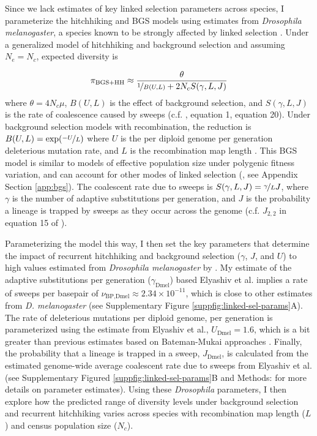 \documentclass[11pt]{article}
\newcommand{\Newnameref}[1]{\textit{\nameref{#1}}}
\begin{document}
Since we lack estimates of key linked selection parameters across species, I
parameterize the hitchhiking and BGS models using estimates from
\emph{Drosophila melanogaster}, a species known to be strongly affected by
linked selection \parencite{Sella2009-nx}. Under a generalized model of
hitchhiking and background selection \parencite{Elyashiv2016-vt,Coop2012-cd}
and assuming $N_e = N_c$, expected diversity is

\begin{align} 
  \pi_\text{BGS+HH} \approx \frac{\theta}{\nicefrac{1}{B(U, L)} + 2N_c S(\gamma, L, J)} 
  \label{eqn:div} 
\end{align}
%
where $\theta = 4N_c\mu$, $B(U,L)$ is the effect of background selection, and
$S(\gamma, L, J)$ is the rate of coalescence caused by sweeps (c.f.
\cite{Elyashiv2016-vt}, equation 1, \cite{Coop2012-cd} equation 20). Under
background selection models with recombination, the reduction is $B(U,L) =
\exp(\nicefrac{-U}{L})$ where $U$ is the per diploid genome per generation
deleterious mutation rate, and $L$ is the recombination map length
\parencite{Hudson1994-oh,Hudson1995-xc,Nordborg1996-nq}. This BGS model is
similar to models of effective population size under polygenic fitness
variation, and can account for other modes of linked selection
(\cite{Robertson1961-ho,Santiago1995-hx,Santiago1998-bs}, see Appendix Section
\ref{app:bgs}). The coalescent rate due to sweeps is $S(\gamma, L, J) =
\nicefrac{\gamma}{L} J$, where $\gamma$ is the number of adaptive substitutions
per generation, and $J$ is the probability a lineage is trapped by sweeps as
they occur across the genome (c.f. $J_{2,2}$ in equation 15 of
\cite{Coop2012-cd}). 

Parameterizing the model this way, I then set the key parameters that determine
the impact of recurrent hitchhiking and background selection ($\gamma$, $J$,
and $U$) to high values estimated from \emph{Drosophila melanogaster} by
\textcite{Elyashiv2016-vt}. My estimate of the adaptive substitutions per
generation ($\gamma_\text{Dmel}$) based Elyashiv et al. implies a rate of
sweeps per basepair of $\nu_\text{BP,Dmel} \approx 2.34 \times 10^{-11}$, which
is close to other estimates from \emph{D.  melanogaster} (see Supplementary
Figure \ref{suppfig:linked-sel-params}A). The rate of deleterious mutations per
diploid genome, per generation is parameterized using the estimate from
Elyashiv et al., $U_\text{Dmel} = 1.6$, which is a bit greater than previous
estimates based on Bateman-Mukai approaches
\parencite{Mukai1985-bc,Mukai1988-vs,Charlesworth1987-ab}. Finally, the
probability that a lineage is trapped in a sweep, $J_\text{Dmel}$, is
calculated from the estimated genome-wide average coalescent rate due to sweeps
from Elyashiv et al. (see Supplementary Figured
\ref{suppfig:linked-sel-params}B and Methods:
\Newnameref{sec:methods-reduction} for more details on parameter estimates).
Using these \emph{Drosophila} parameters, I then explore how the predicted
range of diversity levels under background selection and recurrent hitchhiking
varies across species with recombination map length ($L$) and census population
size ($N_c$).
\end{document}
